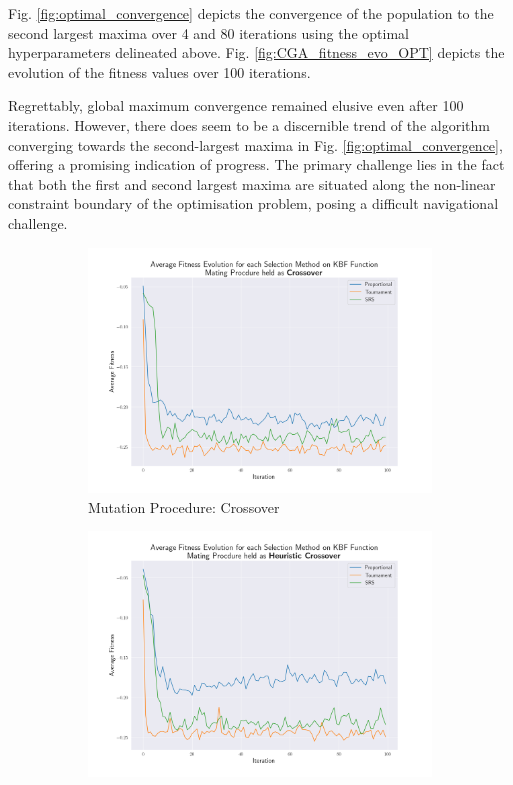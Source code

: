 \documentclass[10pt]{article}
\begin{document}
\begin{multicols}{2}
Fig. \ref{fig:optimal_convergence} depicts the convergence of the population to the second largest maxima over 4 and 80 iterations using the optimal hyperparameters delineated above. Fig. \ref{fig:CGA_fitness_evo_OPT} depicts the evolution of the fitness values over 100 iterations.

Regrettably, global maximum convergence remained elusive even after 100 iterations. However, there does seem to be a discernible trend of the algorithm converging towards the second-largest maxima in Fig. \ref{fig:optimal_convergence}, offering a promising indication of progress. The primary challenge lies in the fact that both the first and second largest maxima are situated along the non-linear constraint boundary of the optimisation problem, posing a difficult navigational challenge.

\begin{figure}[H]
    \centering
    \begin{subfigure}{0.44\textwidth}
        \includegraphics[width=\textwidth]{../figures/Ungenerated Images/Fitness_Evolution_Crossover.png}
        \caption{Mutation Procedure: Crossover}
    \end{subfigure}
    \begin{subfigure}{0.44\textwidth}
        \includegraphics[width=\textwidth]{../figures/Ungenerated Images/Fitness_Evolution_Heuristic Crossover.png}

\end{subfigure}
\end{figure}
\end{multicols}
\end{document}
